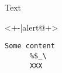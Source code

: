 \documentclass[fragile-frames = true]{xbeamer}
\begin{document}
\begin{frame}
  Text
  \begin{actionenv}<+-|alert@+>
    \begin{Verbatim}[gobble = 6]
      Some content
      %$_\
      XXX
    \end{Verbatim}
  \end{actionenv}
\end{frame}
\end{document}

